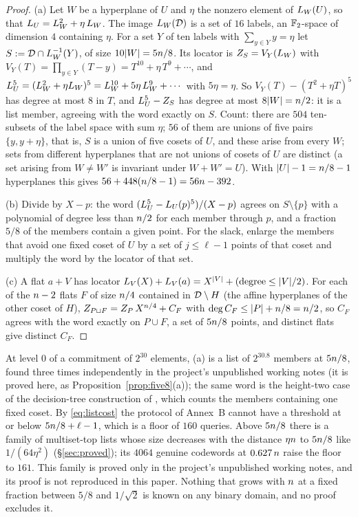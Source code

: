 \begin{proof}
(a) Let $W$ be a hyperplane of $U$ and $\eta$ the nonzero element of $L_W(U)$, so that $L_U=L_W^2+\eta\,L_W$. The image $L_W(\mathcal{D})$ is a set of $16$ labels, an $\mathbb{F}_2$-space of dimension $4$ containing $\eta$. For a set $Y$ of ten labels with $\sum_{y\in Y}y=\eta$ let $S:=\mathcal{D}\cap L_W^{-1}(Y)$, of size $10|W|=5n/8$. Its locator is $Z_S=V_Y(L_W)$ with $V_Y(T)=\prod_{y\in Y}(T-y)=T^{10}+\eta\,T^9+\cdots$, and $L_U^5=(L_W^2+\eta L_W)^5=L_W^{10}+5\eta\,L_W^9+\cdots$ with $5\eta=\eta$. So $V_Y(T)-(T^2+\eta T)^5$ has degree at most $8$ in $T$, and $L_U^5-Z_S$ has degree at most $8|W|=n/2$: it is a list member, agreeing with the word exactly on $S$. Count: there are $504$ ten-subsets of the label space with sum $\eta$; $56$ of them are unions of five pairs $\{y,y+\eta\}$, that is, $S$ is a union of five cosets of $U$, and these arise from every $W$; sets from different hyperplanes that are not unions of cosets of $U$ are distinct (a set arising from $W\ne W'$ is invariant under $W+W'=U$). With $|U|-1=n/8-1$ hyperplanes this gives $56+448(n/8-1)=56n-392$.

(b) Divide by $X-p$: the word $(L_U^5-L_U(p)^5)/(X-p)$ agrees on $S\setminus\{p\}$ with a polynomial of degree less than $n/2$ for each member through $p$, and a fraction $5/8$ of the members contain a given point. For the slack, enlarge the members that avoid one fixed coset of $U$ by a set of $j\le\ell-1$ points of that coset and multiply the word by the locator of that set.

(c) A flat $a+V$ has locator $L_V(X)+L_V(a)=X^{|V|}+(\text{degree}\le|V|/2)$. For each of the $n-2$ flats $F$ of size $n/4$ contained in $\mathcal{D}\setminus H$ (the affine hyperplanes of the other coset of $H$), $Z_{P\sqcup F}=Z_P\,X^{n/4}+C_F$ with $\deg C_F\le|P|+n/8=n/2$, so $C_F$ agrees with the word exactly on $P\cup F$, a set of $5n/8$ points, and distinct flats give distinct $C_F$.
\end{proof}

At level $0$ of a commitment of $2^{30}$ elements, (a) is a list of $2^{30.8}$ members at $5n/8$, found three times independently in the project's unpublished working notes (it is proved here, as Proposition~\ref{prop:five8}(a)); the same word is the height-two case of the decision-tree construction of \cite{DKTZ26}, which counts the members containing one fixed coset. By \eqref{eq:listcost} the protocol of Annex~B cannot have a threshold at or below $5n/8+\ell-1$, which is a floor of $160$ queries. Above $5n/8$ there is a family of multiset-top lists whose size decreases with the distance $\eta n$ to $5n/8$ like $1/(64\eta^2)$ (\S\ref{sec:proved}); its $4064$ genuine codewords at $0.627\,n$ raise the floor to $161$. This family is proved only in the project's unpublished working notes, and its proof is not reproduced in this paper. Nothing that grows with $n$ at a fixed fraction between $5/8$ and $1/\sqrt2$ is known on any binary domain, and no proof excludes it.

